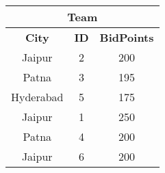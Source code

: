\renewcommand{\arraystretch}{1.2} %
\begin{tabular}{|c|c|c|}
\hline
\multicolumn{3}{|c|}{\textbf{Team}} \\
\hline
\textbf{City} & \textbf{ID} & \textbf{BidPoints} \\
\hline
Jaipur & 2 & 200 \\
Patna & 3 & 195 \\
Hyderabad & 5 & 175 \\
Jaipur & 1 & 250 \\
Patna & 4 & 200 \\
Jaipur & 6 & 200 \\
\hline
\end{tabular}